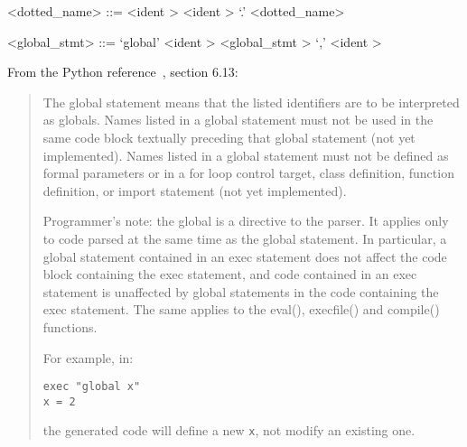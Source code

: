 \begin{grammar}
<dotted_name> ::= <ident \myref[identb]>
	\alt <ident \myref[identb]> `.' <dotted_name>
\end{grammar}


\label{globalzzzstmtb}

\begin{grammar}
<global_stmt> ::= `global' <ident \myref[identb]>
	\alt <global_stmt \myref[globalzzzstmtb]> `,' <ident \myref[identb]>
\end{grammar}


From the Python reference~\cite{pythonlang}, section 6.13:
\begin{quote}
The global statement means that the listed identifiers are to be interpreted as globals.
Names listed in a global statement must not be used in the same code block 
textually preceding that global statement (not yet implemented). Names listed in a global statement must not be defined as formal parameters or in a for loop control target, class definition, function definition, or import statement (not yet implemented).

Programmer's note: the global is a directive to the parser. 
It applies only to code parsed at the same time as the global statement. 
In particular, a global statement contained in an exec statement does not 
affect the code block containing the exec statement, and code contained in 
an exec statement is unaffected by global statements in the code containing 
the exec statement. The same applies to the eval(), execfile() and compile() 
functions.

For example, in:
\begin{verbatim}
exec "global x"
x = 2
\end{verbatim}
the generated code will define a new \verb|x|, not modify an existing one.
\end{quote}

